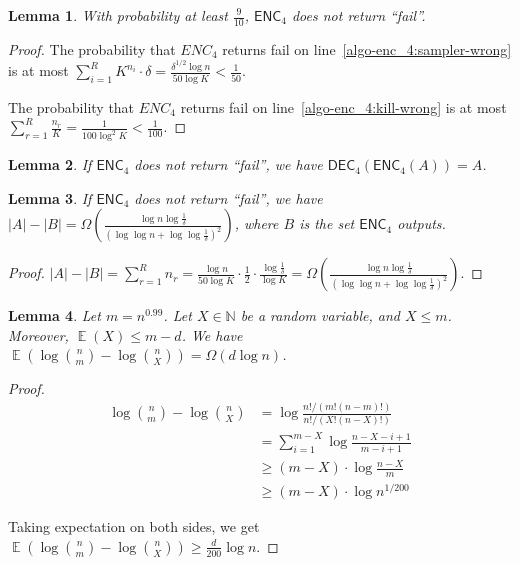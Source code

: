 \documentclass[10pt]{article}
\DeclareMathOperator*{\E}{\mathbb{E}}
\newtheorem{lemma}{Lemma}
\newcommand{\enc}{\textsf{ENC}\xspace}
\newcommand{\dec}{\textsf{DEC}\xspace}
\begin{document}
\begin{lemma} \label{lemma:enc_4-sampler-work}
  With probability at least $\frac{9}{10}$, $\enc_4$ does not return ``fail''. 
\end{lemma}

\begin{proof}
  The probability that $ENC_4$ returns fail on line~\ref{algo-enc_4:sampler-wrong} is at most $\sum_{i=1}^{R} K^{n_i}\cdot \delta = \frac{\delta^{1/2} \log n}{50\log K} < \frac{1}{50}$. 
  
  The probability that $ENC_4$ returns fail on line~\ref{algo-enc_4:kill-wrong} is at most $\sum_{r=1}^{R}{\frac{n_r}{K}}=\frac{1}{100\log^2 K}<\frac{1}{100}$.
  
\end{proof}

\begin{lemma}
  If $\enc_4$ does not return ``fail'', we have $\dec_4(\enc_4(A))=A$.
\end{lemma}

\begin{lemma} \label{lemma:words-saving}
  If $\enc_4$ does not return ``fail'', we have $|A|-|B|=\Omega(\frac{\log n \log \frac{1}{\delta}}{(\log\log n + \log\log \frac{1}{\delta})^2})$, where $B$ is the set $\enc_4$ outputs.
\end{lemma}

\begin{proof}
  $|A|-|B|=\sum_{r=1}^{R}{n_r}= \frac{\log n}{50 \log K} \cdot \frac{1}{2}\cdot \frac{\log \frac{1}{\delta}}{\log K}
  = \Omega(\frac{\log n \log \frac{1}{\delta}}{(\log\log n + \log\log \frac{1}{\delta})^2})$.
\end{proof}


\begin{lemma} \label{lemma:bits-saving}
  Let $m=n^{0.99}$. Let $X\in \mathbb{N}$ be a random variable, and $X\le m$. Moreover, $\E(X)\le m-d$. We have $\E(\log {n \choose m}-\log {n \choose X})=\Omega(d \log n)$.
\end{lemma}

\begin{proof}
  \begin{align*}
    \log {n \choose m}-\log {n \choose X}
    &=   \log \frac{n!/(m!(n-m)!)}{n!/(X!(n-X)!)} \\
    &=   \sum_{i=1}^{m-X}\log \frac{n-X-i+1}{m-i+1} \\
    &\ge (m-X)\cdot \log \frac{n-X}{m} \\
    &\ge (m-X)\cdot \log n^{1/200}
  \end{align*}
  
  Taking expectation on both sides, we get $\E(\log {n \choose m}-\log {n \choose X})\ge \frac{d}{200} \log n$. 
\end{proof}
\end{document}
